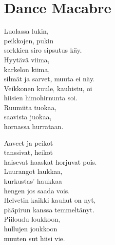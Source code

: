 \section{Dance Macabre}

Luolassa lukin,\\
peikkojen, pukin\\
sorkkien siro sipsutus käy.\\
Hyytävä viima,\\
karkelon kiima,\\
silmät ja sarvet, muuta ei näy.\\
Veikkonen kuule, kauhistu, oi\\
hiisien himohirnunta soi.\\
Ruumiita tuokaa,\\
saavista juokaa,\\
hornassa hurrataan.

Aaveet ja peikot\\
tanssivat, heikot\\
haisevat haaskat horjuvat pois.\\
Luurangot laukkaa,\\
kurkustas’ haukkaa\\
hengen jos saada vois.\\
Helvetin kaikki kauhut on nyt,\\
pääpirun kanssa temmeltänyt.\\
Piiloudu loukkoon,\\
hullujen joukkoon\\
muuten sut hiisi vie.